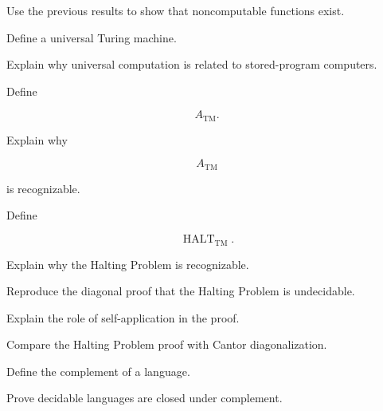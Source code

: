 \begin{exercise}[3]
Use the previous results to show that noncomputable functions exist.
\end{exercise}

\begin{exercise}[2]
Define a universal Turing machine.
\end{exercise}

\begin{exercise}[3]
Explain why universal computation is related to stored-program computers.
\end{exercise}

\begin{exercise}[2]
Define

\[
A_{\mathrm{TM}}.
\]
\end{exercise}

\begin{exercise}[2]
Explain why

\[
A_{\mathrm{TM}}
\]

is recognizable.
\end{exercise}

\begin{exercise}[2]
Define

\[
\operatorname{HALT}_{\mathrm{TM}}.
\]
\end{exercise}

\begin{exercise}[3]
Explain why the Halting Problem is recognizable.
\end{exercise}

\begin{exercise}[3]
Reproduce the diagonal proof that the Halting Problem is undecidable.
\end{exercise}

\begin{exercise}[3]
Explain the role of self-application in the proof.
\end{exercise}

\begin{exercise}[3]
Compare the Halting Problem proof with Cantor diagonalization.
\end{exercise}

\begin{exercise}[2]
Define the complement of a language.
\end{exercise}

\begin{exercise}[2]
Prove decidable languages are closed under complement.
\end{exercise}

